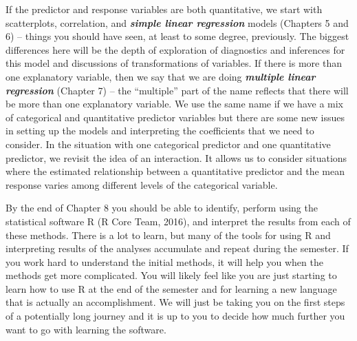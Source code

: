 \documentclass[]{article}
\begin{document}
If the predictor and response variables are both quantitative, we start
with scatterplots, correlation, and \textbf{\emph{simple linear
regression}} models (Chapters 5 and 6) -- things you should have seen,
at least to some degree, previously. The biggest differences here will
be the depth of exploration of diagnostics and inferences for this model
and discussions of transformations of variables. If there is more than
one explanatory variable, then we say that we are doing
\textbf{\emph{multiple linear regression}} (Chapter 7) -- the
``multiple'' part of the name reflects that there will be more than one
explanatory variable. We use the same name if we have a mix of
categorical and quantitative predictor variables but there are some new
issues in setting up the models and interpreting the coefficients that
we need to consider. In the situation with one categorical predictor and
one quantitative predictor, we revisit the idea of an interaction. It
allows us to consider situations where the estimated relationship
between a quantitative predictor and the mean response varies among
different levels of the categorical variable.

By the end of Chapter 8 you should be able to identify, perform using
the statistical software R (R Core Team, 2016), and interpret the
results from each of these methods. There is a lot to learn, but many of
the tools for using R and interpreting results of the analyses
accumulate and repeat during the semester. If you work hard to
understand the initial methods, it will help you when the methods get
more complicated. You will likely feel like you are just starting to
learn how to use R at the end of the semester and for learning a new
language that is actually an accomplishment. We will just be taking you
on the first steps of a potentially long journey and it is up to you to
decide how much further you want to go with learning the software.
\end{document}
